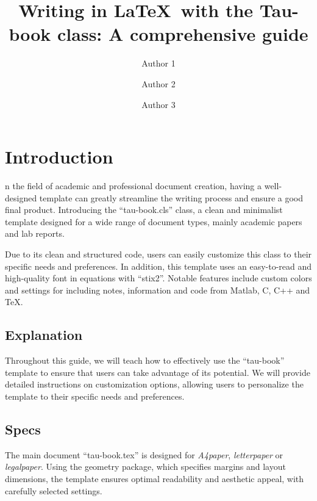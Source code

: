 \documentclass[10pt,a4paper,twoside]{tau-book}
\title{Writing in \LaTeX\ with the Tau-book class: A comprehensive guide}
\author[a,1]{Author 1}
\author[b,2]{Author 2}
\author[b,c,3]{Author 3}
\affil[a]{Department of Mathematics}
\affil[b]{Department of Biology}
\affil[c]{University of Alpha}
\begin{document}
	
    \maketitle
    \abscontent
    \thispagestyle{firststyle}


\section{Introduction}

    n the field of academic and professional document creation, having a well-designed template can greatly streamline the writing process and ensure a good final product. Introducing the ``tau-book.cls'' class, a clean and minimalist template designed for a wide range of document types, mainly academic papers and lab reports. 

    Due to its clean and structured code, users can easily customize this class to their specific needs and preferences. In addition, this template uses an easy-to-read and high-quality font in equations with ``stix2''. Notable features include custom colors and settings for including notes, information and code from Matlab, C, C++ and \TeX.
    
    \subsection{Explanation}	

        Throughout this guide, we will teach how to effectively use the ``tau-book'' template to ensure that users can take advantage of its potential. We will provide detailed instructions on customization options, allowing users to personalize the template to their specific needs and preferences.

    \subsection{Specs}

        The main document ``tau-book.tex'' is designed for \textit{A4paper}, \textit{letterpaper} or \textit{legalpaper}. Using the geometry package, which specifies margins and layout dimensions, the template ensures optimal readability and aesthetic appeal, with carefully selected settings.
\end{document}
